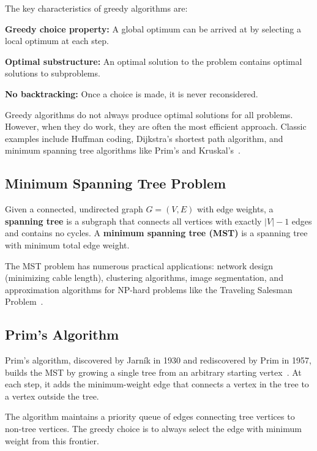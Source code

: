 \documentclass[12pt, a4paper]{report}
\begin{document}
The key characteristics of greedy algorithms are:

\begin{dashenum}
  \item \textbf{Greedy choice property:} A global optimum can be arrived at by selecting a local optimum at each step.
  \item \textbf{Optimal substructure:} An optimal solution to the problem contains optimal solutions to subproblems.
  \item \textbf{No backtracking:} Once a choice is made, it is never reconsidered.
\end{dashenum}

Greedy algorithms do not always produce optimal solutions for all problems. However, when they do work, they are often the most efficient approach. Classic examples include Huffman coding, Dijkstra's shortest path algorithm, and minimum spanning tree algorithms like Prim's and Kruskal's~\cite{ref:cormen}.

\subsection{Minimum Spanning Tree Problem}

Given a connected, undirected graph $G = (V, E)$ with edge weights, a \textbf{spanning tree} is a subgraph that connects all vertices with exactly $|V| - 1$ edges and contains no cycles. A \textbf{minimum spanning tree (MST)} is a spanning tree with minimum total edge weight.

The MST problem has numerous practical applications: network design (minimizing cable length), clustering algorithms, image segmentation, and approximation algorithms for NP-hard problems like the Traveling Salesman Problem~\cite{ref:mst}.

\subsection{Prim's Algorithm}

Prim's algorithm, discovered by Jarník in 1930 and rediscovered by Prim in 1957, builds the MST by growing a single tree from an arbitrary starting vertex~\cite{ref:prim}. At each step, it adds the minimum-weight edge that connects a vertex in the tree to a vertex outside the tree.

The algorithm maintains a priority queue of edges connecting tree vertices to non-tree vertices. The greedy choice is to always select the edge with minimum weight from this frontier.
\end{document}
